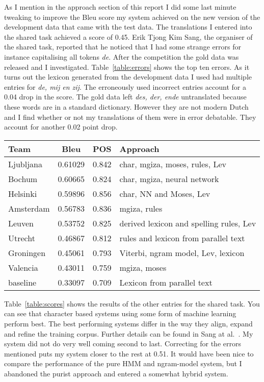 \documentclass[11pt]{article}
\begin{document}
As I mention in the approach section of this report I did some last minute tweaking to improve the Bleu score my system achieved on the new version of the development data that came with the test data. The translations I entered into the shared task achieved a score of 0.45. Erik Tjong Kim Sang, the organiser of the shared task, reported that he noticed that I had some strange errors for instance capitalising all tokens \emph{de}. After the competition the gold data was released and I investigated. Table~\ref{table:errors} shows the top ten errors. As it turns out the lexicon generated from the development data I used had multiple entries for \emph{de, mij en zij}. The erroneously used incorrect entries account for a 0.04 drop in the score. The gold data left \emph{des, der, ende} untranslated because these words are in a standard dictionary. However they are not modern Dutch and I find whether or not my translations of them were in error debatable. They account for another 0.02 point drop. 

\begin{table*}[ht]
  \centering
  \caption{Scores from the different teams}
  \label{table:scores}
  \begin{tabular}{l c c l}
    Team & Bleu & POS & Approach \\
    \hline
    Ljubljana & 0.61029 & 0.842 & char, mgiza, moses, rules, Lev\\
    Bochum & 0.60665 & 0.824 & char, mgiza, neural network \\
    Helsinki & 0.59896 & 0.856 & char, NN and Moses, Lev \\
    Amsterdam & 0.56783 & 0.836 & mgiza, rules \\
    Leuven & 0.53752 & 0.825 & derived lexicon and spelling rules, Lev \\
    Utrecht & 0.46867 & 0.812 & rules and lexicon from parallel text \\
    Groningen & 0.45061 & 0.793 & Viterbi, ngram model, Lev, lexicon \\
    Valencia & 0.43011 & 0.759 & mgiza, moses \\
    baseline & 0.33097 & 0.709 & Lexicon from parallel text \\
  \end{tabular}
\end{table*}

Table~\ref{table:scores} shows the results of the other entries for the shared task. You can see that character based systems using some form of machine learning perform best. The best performing systems differ in the way they align, expand and refine the training corpus. Further details can be found in Sang at al.~. My system did not do very well coming second to last. Correcting for the errors mentioned puts my system closer to the rest at 0.51. It would have been nice to compare the performance of the pure HMM and ngram-model system, but I abandoned the purist approach and entered a somewhat hybrid system.
\end{document}
